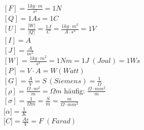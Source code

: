 \begin{minipage}{5cm}
	$\left[F\right] = \frac{1kg \cdot m}{s^2} = 1N$ \\
	$\left[Q\right] = 1 As = 1 C$ \\
	$\left[U\right] = \frac{\lbrack W \rbrack}{\lbrack Q \rbrack} =\frac{1 J}{C} = \frac{1kg \cdot m^2}{A \cdot s^3} = 1 V$ \\
	$\left[I\right] = A $ \\
	$\left[J\right] = \frac {A}{m^2} $\\
	$\left[W\right] = \frac{1kg \cdot m^2}{s^2} = 1Nm = 1 J \; (Joul) = 1 Ws$ \\
	$ \left[P\right] = V \cdot A = W (Watt)$\\
	$\left[G\right] = \frac{A}{V} = S \, (Siemens) = \frac{1}{\Omega}$\\
	$\left[ \rho \right] = \frac{\Omega \cdot m^2}{m} = \Omega m$  häufig:  $\frac{\Omega \cdot mm^2}{m} $\\
	$\left[ \sigma \right] = \frac{1}{\Omega m} = \frac{S}{m} = \frac{m}{\Omega \cdot mm^2} $\\
	$\lbrack \alpha \rbrack = \frac{1}{K}$\\
	$\lbrack C \rbrack = \frac{As}{V} = F \; (Farad)$ \\ 
\end{minipage}

